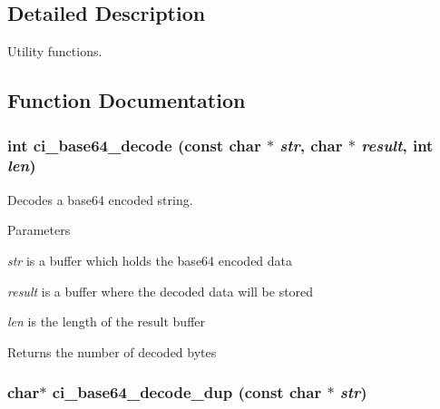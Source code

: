\subsection{Detailed Description}
Utility functions. 

\subsection{Function Documentation}
\hypertarget{group__UTILITY_gab3668540add9634ddb3c7b6ac7addd84}{
\subsubsection[{ci\_\-base64\_\-decode}]{\setlength{\rightskip}{0pt plus 5cm}int ci\_\-base64\_\-decode (const char $\ast$ {\em str}, \/  char $\ast$ {\em result}, \/  int {\em len})}}
\label{group__UTILITY_gab3668540add9634ddb3c7b6ac7addd84}


Decodes a base64 encoded string. 
\begin{DoxyParams}{Parameters}
\item[{\em str}]is a buffer which holds the base64 encoded data \item[{\em result}]is a buffer where the decoded data will be stored \item[{\em len}]is the length of the result buffer \end{DoxyParams}
\begin{DoxyReturn}{Returns}
the number of decoded bytes 
\end{DoxyReturn}
\hypertarget{group__UTILITY_ga3fd517c8b65291980d073ccaf1178cf5}{
\subsubsection[{ci\_\-base64\_\-decode\_\-dup}]{\setlength{\rightskip}{0pt plus 5cm}char$\ast$ ci\_\-base64\_\-decode\_\-dup (const char $\ast$ {\em str})}}
\label{group__UTILITY_ga3fd517c8b65291980d073ccaf1178cf5}


